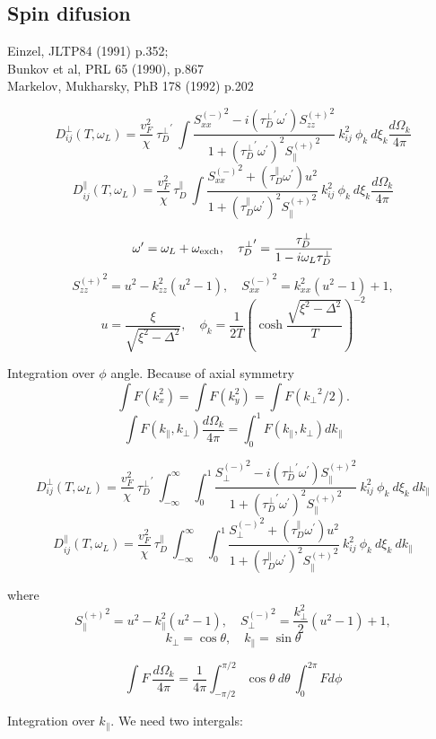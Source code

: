 \documentclass[a4paper]{article}
\begin{document}
\subsection*{Spin difusion}

\def\tdp{\tau_D^\perp}
\def\tdpa{\tau_D^\parallel}
\def\ol{\omega_L}
\def\oe{\omega_{\rm exch}}
\def\op{\omega^\prime}
\def\tp{{\tdp}^\prime}
\def\t{\tdpa}

\def\sm{{S_\perp^{(-)}}^2}
\def\sp{{S_\parallel^{(+)}}^2}

\def\kpe{{k_\perp}}
\def\kpa{{k_\parallel}}

\def\smx{{S_{xx}^{(-)}}^2}
\def\spz{{S_{zz}^{(+)}}^2}


Einzel, JLTP84 (1991) p.352;\\
Bunkov et al, PRL 65 (1990), p.867\\
Markelov, Mukharsky, PhB 178 (1992) p.202

$$
D^\perp_{ij}(T, \ol) =
  \frac{v_F^2}{\chi}\ \tp
  \  \int \frac{\smx - i(\tp\op)\spz}{1+(\tp\op)^2\sp}
  \  k_{ij}^2\ \phi_k\ d\xi_k\frac{d\Omega_k}{4\pi}
$$
$$
D^\parallel_{ij}(T, \ol) =
  \frac{v_F^2}{\chi}\ \t
  \  \int \frac{\smx + (\t\op)u^2 }{1+(\t\op)^2\sp}
  \  k_{ij}^2\ \phi_k\ d\xi_k\frac{d\Omega_k}{4\pi}
$$

$$
\op = \ol+\oe,\quad
\tp = \frac{\tdp}{1-i\ol\tdp}
$$
$$
\spz = u^2 - k_{zz}^2(u^2-1),\quad
\smx = k_{xx}^2(u^2-1) + 1,
$$
$$
u=\frac{\xi}{\sqrt{\xi^2-\Delta^2}}, \quad
\phi_k = \frac{1}{2T}\left(\cosh\frac{\sqrt{\xi^2-\Delta^2}}{T}\right)^{-2}
$$

Integration over $\phi$ angle. Because of axial symmetry
$$
\int F(k_x^2) = \int F(k_y^2) = \int F(\kpe^2/2).
$$
$$
\int F(\kpa,\kpe) \frac{d\Omega_k}{4\pi} =
\int_0^1 F(\kpa,\kpe) d\kpa
$$

$$
D^\perp_{ij}(T, \ol) =
  \frac{v_F^2}{\chi}\ \tp
  \ \int_{-\infty}^{\infty}\ \int_{0}^{1}
  \frac{\sm - i(\tp\op)\sp}{1+(\tp\op)^2\sp}
  \  k_{ij}^2\ \phi_k\ d\xi_k\ d\kpa
$$
$$
D^\parallel_{ij}(T, \ol) =
  \frac{v_F^2}{\chi}\ \t
  \ \int_{-\infty}^{\infty}\ \int_{0}^{1}
  \frac{\sm + (\t\op)u^2 }{1+(\t\op)^2\sp}
  \  k_{ij}^2\ \phi_k\ d\xi_k\ d\kpa
$$

where
$$
\sp = u^2 - k_\parallel^2(u^2-1),\quad
\sm = \frac{k_\perp^2}{2}(u^2-1) + 1,
$$
$$
k_\perp = \cos\theta, \quad
k_\parallel = \sin\theta
$$

$$
\int F\ \frac{d\Omega_k}{4\pi} =
  \frac1{4\pi}\int_{-\pi/2}^{\pi/2} \cos\theta\ d\theta
  \ \int_0^{2\pi} F d\phi
$$

\eject
Integration over $\kpa$. We need two intergals:
\end{document}
